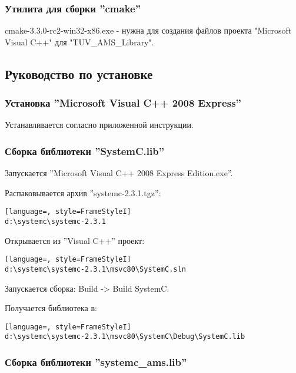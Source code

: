 \subsubsection{Утилита для сборки ''cmake''}


cmake-3.3.0-rc2-win32-x86.exe - нужна для создания файлов проекта "Microsoft Visual C++" для "TUV\_AMS\_Library".






\subsection{Руководство по установке}

\subsubsection{Установка ''Microsoft Visual C++ 2008 Express''}
  Устанавливается согласно приложенной инструкции.
  
  
\subsubsection{Сборка библиотеки ''SystemC.lib''}

Запускается ''Microsoft Visual C++ 2008 Express Edition.exe''.

Распаковывается архив ''systemc-2.3.1.tgz'':
\begin{lstlisting}[language=, style=FrameStyleI]
d:\systemc\systemc-2.3.1
\end{lstlisting}


Открывается из ''Visual C++'' проект:
\begin{lstlisting}[language=, style=FrameStyleI]
d:\systemc\systemc-2.3.1\msvc80\SystemC.sln 
\end{lstlisting}

Запускается сборка: Build -> Build SystemC.

Получается библиотека в:

\begin{lstlisting}[language=, style=FrameStyleI]
d:\systemc\systemc-2.3.1\msvc80\SystemC\Debug\SystemC.lib
\end{lstlisting}





\subsubsection{Сборка библиотеки ''systemc\_ams.lib''}


